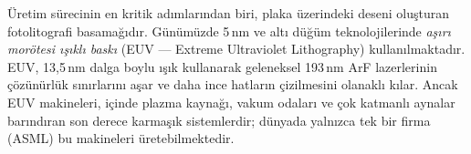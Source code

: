 Üretim sürecinin en kritik adımlarından biri, plaka üzerindeki deseni oluşturan fotolitografi basamağıdır. Günümüzde 5\,nm ve altı düğüm teknolojilerinde \emph{aşırı morötesi ışıklı baskı} (EUV --- Extreme Ultraviolet Lithography) kullanılmaktadır. EUV, 13{,}5\,nm dalga boylu ışık kullanarak geleneksel 193\,nm ArF lazerlerinin çözünürlük sınırlarını aşar ve daha ince hatların çizilmesini olanaklı kılar. Ancak EUV makineleri, içinde plazma kaynağı, vakum odaları ve çok katmanlı aynalar barındıran son derece karmaşık sistemlerdir; dünyada yalnızca tek bir firma (ASML) bu makineleri üretebilmektedir.

\begin{figure}[H]
\centering
{}
\end{figure}

